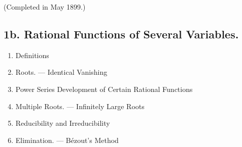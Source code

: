 \vspace{-0.1cm}
{\normalfont(Completed in May 1899.)}

\subsection*{\small1b. Rational Functions of Several Variables. }

\begin{enumerate}[itemsep=0pt]
    \item Definitions
    \item Roots. — Identical Vanishing
    \item Power Series Development of Certain Rational Functions
    \item Multiple Roots. — Infinitely Large Roots
    \item Reducibility and Irreducibility
    \item Elimination. — Bézout's Method
\end{enumerate}
